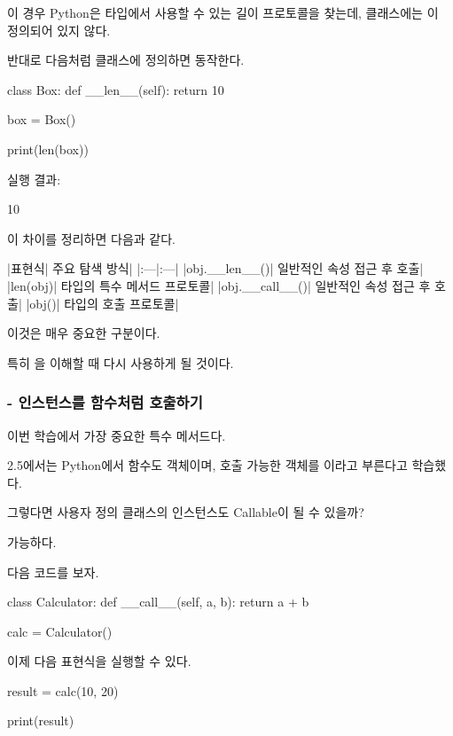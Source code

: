 이 경우 Python은  타입에서 사용할 수 있는 길이 프로토콜을 찾는데,  클래스에는 이 정의되어 있지 않다.

반대로 다음처럼 클래스에 정의하면 동작한다.

\begin{dhkcode}
class Box:
    def __len__(self):
        return 10


box = Box()

print(len(box))
\end{dhkcode}

실행 결과:

\begin{dhkzsh}
10
\end{dhkzsh}

이 차이를 정리하면 다음과 같다.

\begin{dhktable}
|표현식|	주요 탐색 방식|
|:---|:---|
|obj.__len__()|	일반적인 속성 접근 후 호출|
|len(obj)|	타입의 특수 메서드 프로토콜|
|obj.__call__()|	일반적인 속성 접근 후 호출|
|obj()|	타입의 호출 프로토콜|
\end{dhktable}

이것은 매우 중요한 구분이다.

특히 을 이해할 때 다시 사용하게 될 것이다.

\subsubsection{ - 인스턴스를 함수처럼 호출하기}

이번 학습에서 가장 중요한 특수 메서드다.

2.5에서는 Python에서 함수도 객체이며, 호출 가능한 객체를 이라고 부른다고 학습했다.

그렇다면 사용자 정의 클래스의 인스턴스도 Callable이 될 수 있을까?

가능하다.

다음 코드를 보자.

\begin{dhkcode}
class Calculator:
    def __call__(self, a, b):
        return a + b


calc = Calculator()
\end{dhkcode}

이제 다음 표현식을 실행할 수 있다.

\begin{dhkcode}
result = calc(10, 20)

print(result)
\end{dhkcode}

